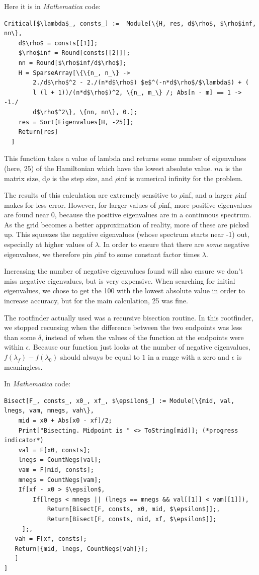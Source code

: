 \documentclass[12pt,twoside]{reedthesis}
\begin{document}
Here it is in \emph{Mathematica} code:
\begin{Verbatim}[commandchars=\\\{\}, codes={\catcode`$=3}]
Critical[$\lambda$_, consts_] :=  Module[\{H, res, d$\rho$, $\rho$inf, nn\},
    d$\rho$ = consts[[1]];
    $\rho$inf = Round[consts[[2]]];
    nn = Round[$\rho$inf/d$\rho$];
    H = SparseArray[\{\{n_, n_\} -> 
        2./d$\rho$^2 - 2./(n*d$\rho$) $e$^(-n*d$\rho$/$\lambda$) + (
        l (l + 1))/(n*d$\rho$)^2, \{n_, m_\} /; Abs[n - m] == 1 -> -1./
        d$\rho$^2\}, \{nn, nn\}, 0.];
    res = Sort[Eigenvalues[H, -25]];
    Return[res]
  ]
\end{Verbatim}
This function takes a value of lambda and returns some number of eigenvalues (here, 25)  of the Hamiltonian which have the lowest absolute value. $nn$ is the matrix size, d$\rho$ is the step size, and $\rho$inf is numerical infinity for the problem.

The results of this calculation are extremely sensitive to $\rho$inf, and a larger $\rho$inf makes for less error. However, for larger values of $\rho$inf, more positive eigenvalues are found near 0, because the positive eigenvalues are in a continuous spectrum. As the grid becomes a better approximation of reality, more of these are picked up. This squeezes the negative eigenvalues (whose spectrum starts near -1) out, especially at higher values of $\lambda$. In order to ensure that there are \emph{some} negative eigenvalues, we therefore pin $\rho$inf to some constant factor times $\lambda$. 

Increasing the number of negative eigenvalues found will also ensure we don't miss negative eigenvalues, but is very expensive. When searching for initial eigenvalues, we chose to get the 100 with the lowest absolute value in order to increase accuracy, but for the main calculation, 25 was fine.

The rootfinder actually used was a recursive bisection routine. In this rootfinder, we stopped recursing when the difference between the two endpoints was less than some $\delta$, instead of when the values of the function at the endpoints were within $\epsilon$. Because our function just looks at the number of negative eigenvalues, $f(\lambda_f) - f(\lambda_0)$ should always be equal to $1$ in a range with a zero and $\epsilon$ is meaningless. 

In \emph{Mathematica} code:

\begin{Verbatim}[commandchars=\\\{\}, codes={\catcode`$=3}]
Bisect[F_, consts_, x0_, xf_, $\epsilon$_] := Module[\{mid, val, lnegs, vam, mnegs, vah\},
    mid = x0 + Abs[x0 - xf]/2;
    Print["Bisecting. Midpoint is " <> ToString[mid]]; (*progress indicator*)
    val = F[x0, consts];
    lnegs = CountNegs[val];
    vam = F[mid, consts];
    mnegs = CountNegs[vam];
    If[xf - x0 > $\epsilon$,
        If[lnegs < mnegs || (lnegs == mnegs && val[[1]] < vam[[1]]), 
            Return[Bisect[F, consts, x0, mid, $\epsilon$]];, 
            Return[Bisect[F, consts, mid, xf, $\epsilon$]]; 
     ];,
   vah = F[xf, consts];
   Return[{mid, lnegs, CountNegs[vah]}];
   ]
]
\end{Verbatim}
\end{document}
